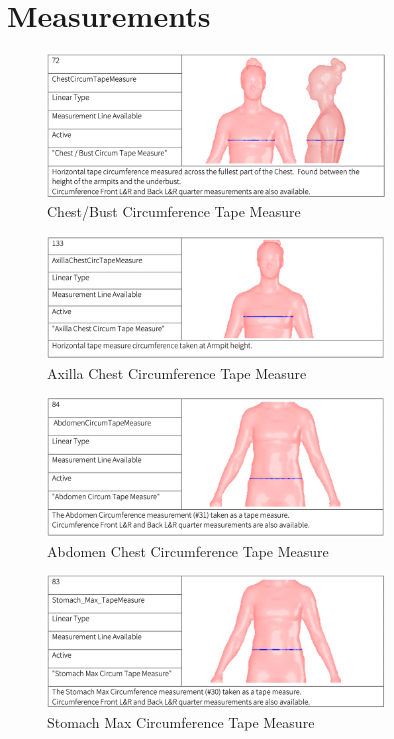 \section{Measurements}
\begin{figure} [H]
    \centering
    \includegraphics[width = 0.8\textwidth]{Images/ChestBustCircTM.png}
    \caption{Chest/Bust Circumference Tape Measure}
\end{figure}
\begin{figure} [H]
    \centering
    \includegraphics[width = 0.8\textwidth]{Images/AxillaCircTM.png}
    \caption{Axilla Chest Circumference Tape Measure}
\end{figure}
\begin{figure} [H]
    \centering
    \includegraphics[width = 0.8\textwidth]{Images/AbdomenCircTM.png}
    \caption{Abdomen Chest Circumference Tape Measure}
\end{figure}
\begin{figure} [H]
    \centering
    \includegraphics[width = 0.8\textwidth]{Images/StomachMaxTM.png}
    \caption{Stomach Max Circumference Tape Measure}
\end{figure}
